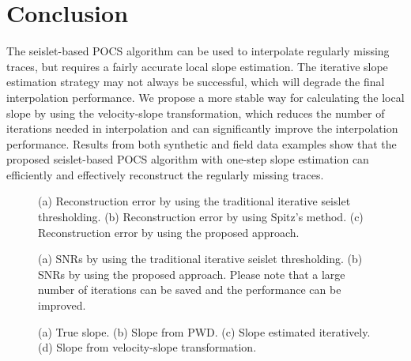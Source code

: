 \section{Conclusion}
The seislet-based POCS algorithm can be used to interpolate regularly missing traces, but requires a fairly accurate local slope estimation. The iterative slope estimation strategy may not always  be successful, which will degrade the final interpolation performance. We propose a more stable way for calculating the local slope by using the velocity-slope transformation, which reduces the number of iterations needed in interpolation and can significantly improve the interpolation performance. Results from both synthetic and field data examples show that the proposed seislet-based POCS algorithm with one-step slope estimation can efficiently and effectively reconstruct the regularly missing traces.

\begin{figure}[htb!]
  \centering
	\caption{(a) Reconstruction error by using the traditional iterative seislet thresholding. (b) Reconstruction error by using Spitz's method. (c) Reconstruction error by using the proposed approach.  }
   \label{fig:hyper-seis-dif,hyper-fx-dif,hyper-seisvd-dif}
\end{figure}

\begin{figure}[htb!]
  \centering
	\caption{(a) SNRs by using the traditional iterative seislet thresholding. (b) SNRs by using the proposed approach. Please note that a large number of iterations can be saved and the performance can be improved.}
   \label{fig:snrs-pocs,snrs-pocsvd}
\end{figure}

\begin{figure}[htb!]
  \centering
	\caption{(a) True slope. (b) Slope from PWD. (c) Slope estimated iteratively. (d) Slope from velocity-slope transformation.  }
   \label{fig:hyper-sdip,hyper-pdip,hyper-dipiter,hyper-vdip}
\end{figure}


